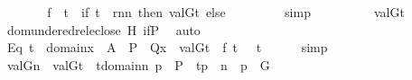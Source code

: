 \begin{isabellebody}
\ \ \ \ \isamarkupfalse%
\ \isamarkupfalse%
\ {\isachardoublequoteopen}{\isacharquery}{\kern0pt}f\ {\isacharbackquote}{\kern0pt}\ t\ {\isacharequal}{\kern0pt}\ {\isacharparenleft}{\kern0pt}if\ t\ {\isasymin}\ {\isacharquery}{\kern0pt}r{\isacharparenleft}{\kern0pt}{\isacharquery}{\kern0pt}n{\isacharparenright}{\kern0pt}{\isacharminus}{\kern0pt}{\isacharbackquote}{\kern0pt}{\isacharbackquote}{\kern0pt}{\isacharbraceleft}{\kern0pt}{\isacharquery}{\kern0pt}n{\isacharbraceright}{\kern0pt}\ then\ val{\isacharparenleft}{\kern0pt}G{\isacharcomma}{\kern0pt}t{\isacharparenright}{\kern0pt}\ else\ {}{\isacharparenright}{\kern0pt}{\isachardoublequoteclose}\isanewline
\ \ \ \ \ \ \isamarkupfalse%
\ simp\isanewline
\ \ \ \ \isamarkupfalse%
\ \isamarkupfalse%
\ {\isachardoublequoteopen}{\isachardot}{\kern0pt}{\isachardot}{\kern0pt}{\isachardot}{\kern0pt}\ {\isacharequal}{\kern0pt}\ val{\isacharparenleft}{\kern0pt}G{\isacharcomma}{\kern0pt}t{\isacharparenright}{\kern0pt}{\isachardoublequoteclose}\isanewline
\ \ \ \ \ \ \isamarkupfalse%
\ dom{\isacharunderscore}{\kern0pt}under{\isacharunderscore}{\kern0pt}edrel{\isacharunderscore}{\kern0pt}eclose\ H\ if{\isacharunderscore}{\kern0pt}P\ \isamarkupfalse%
\ auto\isanewline
\ \ \isacommand{{\isacharbraceright}{\kern0pt}}\isamarkupfalse%
\isanewline
\ \ \isamarkupfalse%
\isanewline
\ \ \isamarkupfalse%
\ Eq{}{\isacharcolon}{\kern0pt}\ {\isachardoublequoteopen}t\ {\isasymin}\ domain{\isacharparenleft}{\kern0pt}{\isacharbraceleft}{\kern0pt}x\ {\isasymin}\ A\ {\isasymtimes}\ P\ {\isachardot}{\kern0pt}\ Q{\isacharparenleft}{\kern0pt}x{\isacharparenright}{\kern0pt}{\isacharbraceright}{\kern0pt}{\isacharparenright}{\kern0pt}\ {\isasymLongrightarrow}\ val{\isacharparenleft}{\kern0pt}G{\isacharcomma}{\kern0pt}t{\isacharparenright}{\kern0pt}\ {\isacharequal}{\kern0pt}\ {\isacharquery}{\kern0pt}f{\isacharbackquote}{\kern0pt}\ t{\isachardoublequoteclose}\ \ \ t\isanewline
\ \ \ \ \isamarkupfalse%
\ simp\isanewline
\ \ \isamarkupfalse%
\ {\isachardoublequoteopen}val{\isacharparenleft}{\kern0pt}G{\isacharcomma}{\kern0pt}{\isacharquery}{\kern0pt}n{\isacharparenright}{\kern0pt}\ {\isacharequal}{\kern0pt}\ {\isacharbraceleft}{\kern0pt}val{\isacharparenleft}{\kern0pt}G{\isacharcomma}{\kern0pt}t{\isacharparenright}{\kern0pt}\ {\isachardot}{\kern0pt}{\isachardot}{\kern0pt}\ t{\isasymin}domain{\isacharparenleft}{\kern0pt}{\isacharquery}{\kern0pt}n{\isacharparenright}{\kern0pt}{\isacharcomma}{\kern0pt}\ {\isasymexists}p\ {\isasymin}\ P\ {\isachardot}{\kern0pt}\ {\isasymlangle}t{\isacharcomma}{\kern0pt}p{\isasymrangle}\ {\isasymin}\ {\isacharquery}{\kern0pt}n\ {\isasymand}\ p\ {\isasymin}\ G{\isacharbraceright}{\kern0pt}{\isachardoublequoteclose}\isanewline

\end{isabellebody}
